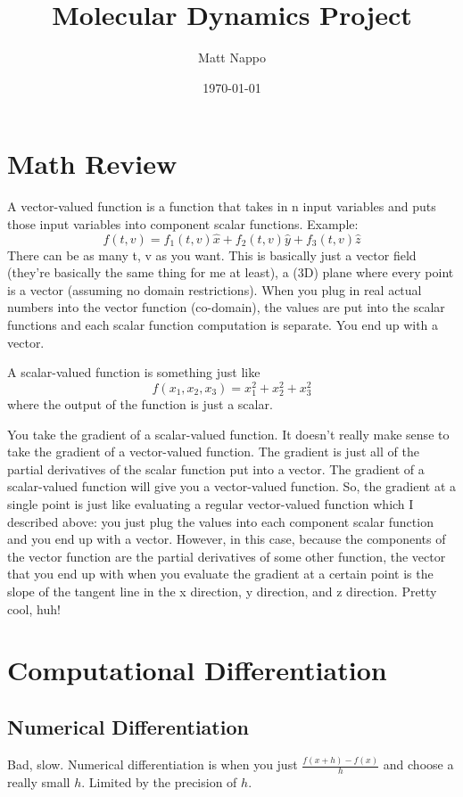 \documentclass{article}
\title{Molecular Dynamics Project}
\author{Matt Nappo}
\date{\today}
\begin{document}
\section{Math Review}

A vector-valued function is a function that takes in n input variables and puts those input variables into component scalar functions. Example: $$f(t, v) = f_1(t, v)\hat x + f_2(t, v)\hat y + f_3(t, v)\hat z$$ There can be as many t, v as you want. This is basically just a vector field (they're basically the same thing for me at least), a (3D) plane where every point is a vector (assuming no domain restrictions). When you plug in real actual numbers into the vector function (co-domain), the values are put into the scalar functions and each scalar function computation is separate. You end up with a vector.

A scalar-valued function is something just like $$f(x_1, x_2, x_3) = x_1^2 + x_2^2 + x_3^2$$ where the output of the function is just a scalar.

You take the gradient of a scalar-valued function. It doesn't really make sense to take the gradient of a vector-valued function. The gradient is just all of the partial derivatives of the scalar function put into a vector. The gradient of a scalar-valued function will give you a vector-valued function. So, the gradient at a single point is just like evaluating a regular vector-valued function which I described above: you just plug the values into each component scalar function and you end up with a vector. However, in this case, because the components of the vector function are the partial derivatives of some other function, the vector that you end up with when you evaluate the gradient at a certain point is the slope of the tangent line in the x direction, y direction, and z direction. Pretty cool, huh!

\section {Computational Differentiation}

\subsection {Numerical Differentiation}
Bad, slow. Numerical differentiation is when you just $\frac{f(x+h)-f(x)}{h}$ and choose a really small $h$. Limited by the precision of $h$.
\end{document}

